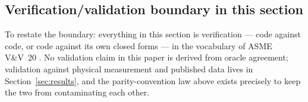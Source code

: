 \subsection{Verification/validation boundary in this section}

To restate the boundary: everything in this section is verification ---
code against code, or code against its own closed forms --- in the
vocabulary of ASME V\&V~20 \citep{asme2009vv20}. No validation claim in
this paper is derived from oracle agreement; validation against physical
measurement and published data lives in Section~\ref{sec:results}, and
the parity-convention law above exists precisely to keep the two from
contaminating each other.

